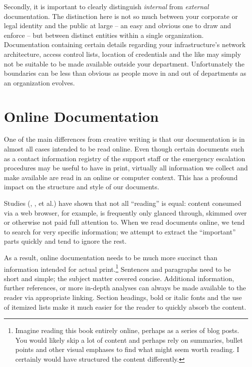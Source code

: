 Secondly, it is important to clearly distinguish {\em
internal} from {\em external} documentation.  The
distinction here is not so much between your corporate
or legal identity and the public at large -- an easy
and obvious one to draw and enforce -- but between
distinct entities within a single organization.
Documentation containing certain details regarding
your infrastructure's network architecture, access
control lists, location of credentials and the like
may simply not be suitable to be made available
outside your department.  Unfortunately the boundaries
can be less than obvious as people move in and out of
departments as an organization evolves.

\section{Online Documentation}
\label{documentation:online-documentation}

One of the main differences from creative writing is
that our documentation is in almost all cases intended
to be read online.  Even though certain documents such
as a contact information registry of the support staff
or the emergency escalation procedures may be useful
to have in print, virtually all information we collect
and make available are read in an online or computer
context.  This has a profound impact on the structure
and style of our documents.

Studies (\cite{doc:online-literacy},
\cite{doc:nielson-web-writing}, et al.) have shown
that not all ``reading'' is equal:  content consumed
via a web browser, for example, is frequently only
glanced through, skimmed over or otherwise not paid
full attention to.  When we read documents online, we
tend to search for very specific information; we
attempt to extract the ``important'' parts quickly and
tend to ignore the rest.

As a result, online documentation needs to be much
more succinct than information intended for actual
print.\footnote{Imagine reading this book entirely
online, perhaps as a series of blog posts.  You would
likely skip a lot of content and perhaps rely on
summaries, bullet points and other visual emphases to
find what might seem worth reading.  I certainly would
have structured the content differently.}  Sentences
and paragraphs need to be short and simple; the
subject matter covered concise.  Additional
information, further references, or more in-depth
analyses can always be made available to the reader
via appropriate linking.  Section headings, bold or
italic fonts and the use of itemized lists make it
much easier for the reader to quickly absorb the
content.


